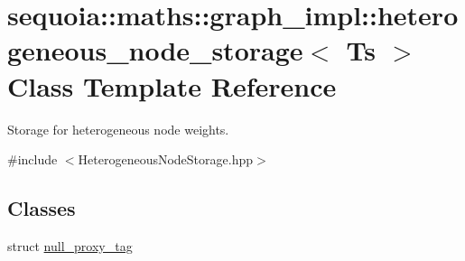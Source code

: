 \hypertarget{classsequoia_1_1maths_1_1graph__impl_1_1heterogeneous__node__storage}{}\section{sequoia\+::maths\+::graph\+\_\+impl\+::heterogeneous\+\_\+node\+\_\+storage$<$ Ts $>$ Class Template Reference}
\label{classsequoia_1_1maths_1_1graph__impl_1_1heterogeneous__node__storage}


Storage for heterogeneous node weights.  




{\ttfamily \#include $<$Heterogeneous\+Node\+Storage.\+hpp$>$}

\subsection*{Classes}
\begin{DoxyCompactItemize}
\item 
struct \mbox{\hyperlink{structsequoia_1_1maths_1_1graph__impl_1_1heterogeneous__node__storage_1_1null__proxy__tag}{null\+\_\+proxy\+\_\+tag}}
\end{DoxyCompactItemize}
